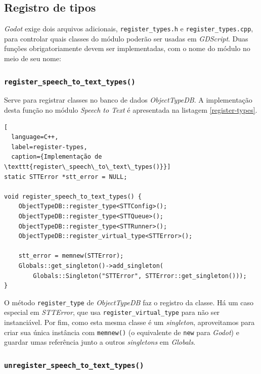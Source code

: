 
\subsection{Registro de tipos}

\textit{Godot} exige dois arquivos adicionais, \texttt{register\_types.h} e \texttt{register\_types.cpp}, para controlar quais classes do módulo poderão ser usadas em \mbox{\textit{GDScript}}. Duas funções obrigatoriamente devem ser implementadas, com o nome do módulo no meio de seu nome:

\subsubsection{\texttt{register\_speech\_to\_text\_types()}}

Serve para registrar classes no banco de dados \textit{ObjectTypeDB}. A implementação desta função no módulo \textit{Speech to Text} é apresentada na listagem \ref{register-types}.

\begin{lstlisting}[
  language=C++,
  label=register-types,
  caption={Implementação de \texttt{register\_speech\_to\_text\_types()}}]
static STTError *stt_error = NULL;

void register_speech_to_text_types() {
    ObjectTypeDB::register_type<STTConfig>();
    ObjectTypeDB::register_type<STTQueue>();
    ObjectTypeDB::register_type<STTRunner>();
    ObjectTypeDB::register_virtual_type<STTError>();

    stt_error = memnew(STTError);
    Globals::get_singleton()->add_singleton(
        Globals::Singleton("STTError", STTError::get_singleton()));
}
\end{lstlisting}

O método \texttt{register\_type} de \textit{ObjectTypeDB} faz o registro da classe. Há um caso especial em \textit{STTError}, que usa \texttt{register\_virtual\_type} para não ser instanciável. Por fim, como esta mesma classe é um \textit{singleton}, aproveitamos para criar sua única instância com \texttt{memnew()} (o equivalente de \texttt{new} para \textit{Godot}) e guardar umas referência junto a outros \textit{singletons} em \textit{Globals}.

\subsubsection{\texttt{unregister\_speech\_to\_text\_types()}}

